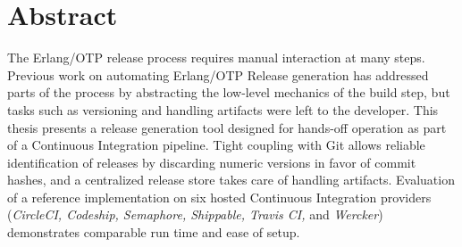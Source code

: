 \cleardoublepage{}

\section*{Abstract}

The Erlang/OTP release process requires manual interaction at many steps. Previous work on automating Erlang/OTP Release generation has addressed parts of the process by abstracting the low-level mechanics of the build step, but tasks such as versioning and handling artifacts were left to the developer. This thesis presents a release generation tool designed for hands-off operation as part of a Continuous Integration pipeline. Tight coupling with Git allows reliable identification of releases by discarding numeric versions in favor of commit hashes, and a centralized release store takes care of handling artifacts. Evaluation of a reference implementation on six hosted Continuous Integration providers (\emph{CircleCI, Codeship, Semaphore, Shippable, Travis CI,} and \emph{Wercker}) demonstrates comparable run time and ease of setup.

